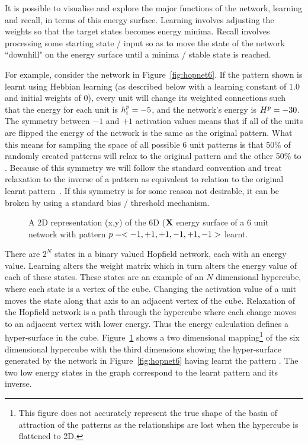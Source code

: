 It is possible to visualise and explore the major functions of the network, learning and recall, in terms of this energy surface.  Learning involves adjusting the weights so that the target states becomes energy minima.  Recall involves processing some starting state / input so as to move the state of the network ``downhill" on the energy surface until a minima / stable state is reached.  

For example, consider the network in Figure~\ref{fig:hopnet6}.  If the pattern shown is learnt using Hebbian learning (as described below with a learning constant of $1.0$ and initial weights of $0$), every unit will change its weighted connections such that the energy for each unit is $h_{i}^{p}=-5$, and the network's energy is $H^{p}=-30$.  The symmetry between $-1$ and $+1$ activation values means that if all of the units are flipped the energy of the network is the same as the original pattern.  What this means for sampling the space of all possible 6 unit patterns is that 50\% of randomly created patterns will relax to the original pattern  and the other 50\% to . Because of this symmetry we will follow the standard convention and treat relaxation to the inverse of a pattern as equivalent to relation to the original learnt pattern~\citep{Hopfield1982}. If this symmetry is for some reason not desirable, it can be broken by using a standard bias / threshold mechanism.

\begin{figure}[ht]
	\center
	\scalebox{0.7}{}
	\caption{A 2D representation (x,y) of the 6D (\(\mathbf{X}\) energy surface of a 6 unit network  with pattern $p=<-1,+1,+1,-1,+1,-1>$ learnt.}
	\label{fig:EnergySurfaceHopnet}
\end{figure}

There are $2^N$ states in a binary valued Hopfield network, each with an energy value.  Learning alters the weight matrix which in turn alters the energy value of each of these states.  These states are an example of an $N$ dimensional hypercube, where each state is a vertex of the cube.  Changing the activation value of a unit moves the state along that axis to an adjacent vertex of the cube. Relaxation of the Hopfield network is a path through the hypercube where each change moves to an adjacent vertex with lower energy.  Thus the energy calculation defines a hyper-surface in the cube.  Figure~\ref{fig:EnergySurfaceHopnet} shows a two dimensional mapping\footnote{This figure does not accurately represent the true shape of the basin of attraction of the patterns as the relationships are lost when the hypercube is flattened to 2D.} of the six dimensional hypercube with the third dimensions showing the hyper-surface generated by the network in Figure~\ref{fig:hopnet6} having learnt the pattern .  The two low energy states in the graph correspond to the learnt pattern and its inverse.

